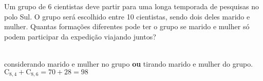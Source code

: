 \begin{ex}
Um grupo de 6 cientistas deve partir para uma longa temporada de pesquisas no polo Sul. O grupo será escolhido entre 10 cientistas, sendo dois deles marido e mulher. Quantas formações diferentes pode ter o grupo se marido e mulher só podem participar da expedição viajando juntos?
  \begin{sol}
   \phantom{A} \\
   considerando marido e mulher no grupo \textbf{ou} tirando marido e mulher do grupo.\\
   $\mathrm{C}_{8,4} +\mathrm{C}_{8,6}= 70+28=98$
  \end{sol}
\end{ex}